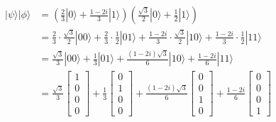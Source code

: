 \begin{align*}
    |\psi\rangle|\phi\rangle & = \left(\frac{2}{3}|0\rangle+\frac{1-2i}{3}|1\rangle\right)\left(\frac{\sqrt{3}}{2}|0\rangle+\frac{1}{2}|1\rangle\right)                                                            \\
                             & = \frac{2}{3}\cdot\frac{\sqrt{3}}{2}|00\rangle + \frac{2}{3}\cdot\frac{1}{2}|01\rangle + \frac{1-2i}{3}\cdot\frac{\sqrt{3}}{2}|10\rangle + \frac{1-2i}{3}\cdot\frac{1}{2}|11\rangle \\
                             & = \frac{\sqrt{3}}{3}|00\rangle + \frac{1}{3}|01\rangle + \frac{(1-2i)\sqrt{3}}{6}|10\rangle + \frac{1-2i}{6}|11\rangle                                                              \\
                             & = \frac{\sqrt{3}}{3} \begin{bmatrix}
                                                        1 \\
                                                        0 \\
                                                        0 \\
                                                        0
                                                    \end{bmatrix}
    + \frac{1}{3} \begin{bmatrix}
                      0 \\
                      1 \\
                      0 \\
                      0
                  \end{bmatrix}
    + \frac{(1-2i)\sqrt{3}}{6} \begin{bmatrix}
                                   0 \\
                                   0 \\
                                   1 \\
                                   0
                               \end{bmatrix}
    + \frac{1-2i}{6} \begin{bmatrix}
                         0 \\
                         0 \\
                         0 \\
                         1
                     \end{bmatrix}                                                                                                                                                                                \\

\end{align*}
